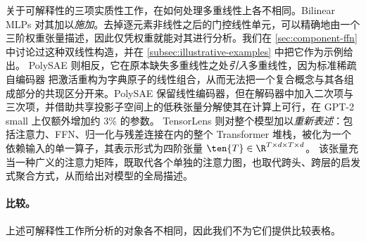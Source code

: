 关于可解释性的三项实质性工作，在如何处理多重线性上各不相同。Bilinear MLPs \cite{pearce2025bilinearmlp} 对其加以\emph{施加}。去掉逐元素非线性之后的门控线性单元，可以精确地由一个三阶权重张量描述，因此仅凭权重就能对其进行分析。我们在 \cref{sec:component-ffn} 中讨论过这种双线性构造，并在 \cref{subsec:illustrative-examples} 中把它作为示例给出。
PolySAE \cite{koromilas2026polysae} 则相反，它在原本缺失多重线性之处\emph{引入}多重线性，因为标准稀疏自编码器 \cite{cunningham2023sae} 把激活重构为字典原子的线性组合，从而无法把一个复合概念与其各组成部分的共现区分开来。PolySAE 保留线性编码器，但在解码器中加入二次项与三次项，并借助共享投影子空间上的低秩张量分解使其在计算上可行，在 GPT-2 small 上仅额外增加约 $3\%$ 的参数。
TensorLens \cite{atad2026tensorlens} 则对整个模型加以\emph{重新表述}：包括注意力、FFN、归一化与残差连接在内的整个 Transformer 堆栈，被化为一个依赖输入的单一算子，其表示形式为四阶张量 $\ten{T} \in \R^{T \times d \times T \times d}$。
该张量充当一种广义的注意力矩阵，既取代各个单独的注意力图，也取代跨头、跨层的启发式聚合方式，从而给出对模型的全局描述。

\paragraph{比较。} 
上述可解释性工作所分析的对象各不相同，因此我们不为它们提供比较表格。




